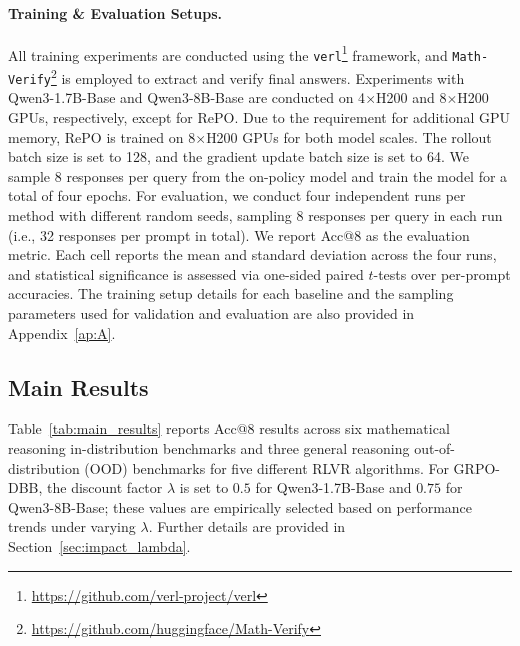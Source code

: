 \paragraph{Training \& Evaluation Setups.}
All training experiments are conducted using the \texttt{verl}\footnote{\url{https://github.com/verl-project/verl}} framework, and \texttt{Math-Verify}\footnote{\url{https://github.com/huggingface/Math-Verify}} is employed to extract and verify final answers.
Experiments with Qwen3-1.7B-Base and Qwen3-8B-Base are conducted on 4$\times$H200 and 8$\times$H200 GPUs, respectively, except for RePO.
Due to the requirement for additional GPU memory, RePO is trained on 8$\times$H200 GPUs for both model scales.
The rollout batch size is set to 128, and the gradient update batch size is set to 64.
We sample 8 responses per query from the on-policy model and train the model for a total of four epochs.
For evaluation, we conduct four independent runs per method with different random seeds, sampling 8 responses per query in each run (i.e., 32 responses per prompt in total).
We report Acc@8 as the evaluation metric.
Each cell reports the mean and standard deviation across the four runs, and statistical significance is assessed via one-sided paired $t$-tests over per-prompt accuracies.
The training setup details for each baseline and the sampling parameters used for validation and evaluation are also provided in Appendix~\ref{ap:A}.



\subsection{Main Results}
\label{subsec:mainresult}

Table~\ref{tab:main_results} reports Acc@8 results across six mathematical reasoning in-distribution benchmarks and three general reasoning out-of-distribution (OOD) benchmarks for five different RLVR algorithms.
For GRPO-DBB, the discount factor $\lambda$ is set to $0.5$ for Qwen3-1.7B-Base and $0.75$ for Qwen3-8B-Base; these values are empirically selected based on performance trends under varying $\lambda$.
Further details are provided in Section~\ref{sec:impact_lambda}.


